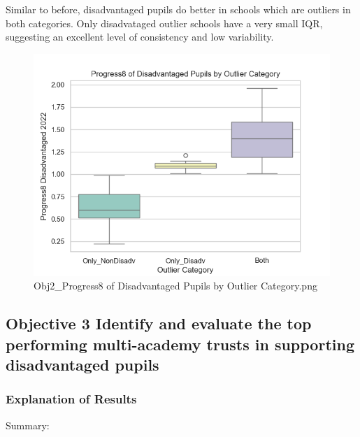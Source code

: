 \documentclass[
  letterpaper,
  DIV=11,
  numbers=noendperiod]{scrartcl}
\begin{document}
Similar to before, disadvantaged pupils do better in schools which are
outliers in both categories. Only disadvataged outlier schools have a
very small IQR, suggesting an excellent level of consistency and low
variability.

\begin{figure}[H]

{\centering \includegraphics{images/Obj2_Progress8 of Disadvantaged Pupils by Outlier Category.png}

}

\caption{Obj2\_Progress8 of Disadvantaged Pupils by Outlier
Category.png}

\end{figure}%

\subsection{Objective 3 Identify and evaluate the top performing
multi-academy trusts in supporting disadvantaged
pupils}\label{objective-3-identify-and-evaluate-the-top-performing-multi-academy-trusts-in-supporting-disadvantaged-pupils}

\subsubsection{Explanation of Results}\label{explanation-of-results-1}

Summary:
\end{document}
